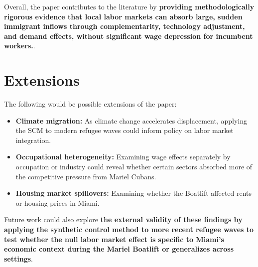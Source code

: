 \documentclass[12pt]{article}
\begin{document}
Overall, the paper contributes to the literature by \textbf{providing
methodologically rigorous evidence that local labor markets can absorb
large, sudden immigrant inflows through complementarity, technology
adjustment, and demand effects, without significant wage depression
for incumbent workers.}.

\section{Extensions}

The following would be possible extensions of the paper:

\begin{itemize}
    \item \textbf{Climate migration:} As climate change accelerates
    displacement, applying the SCM to modern refugee waves could
    inform policy on labor market integration.
    \item \textbf{Occupational heterogeneity:} Examining wage effects
    separately by occupation or industry could reveal whether certain
    sectors absorbed more of the competitive pressure from Mariel Cubans.
    \item \textbf{Housing market spillovers:} Examining whether the Boatlift affected rents or housing prices in Miami.
\end{itemize}

Future work could also explore \textbf{the external validity of these findings by applying the synthetic control method to more recent refugee waves to test whether the null labor market effect is specific to Miami's economic context during the Mariel Boatlift or generalizes across settings}.



\end{document}
